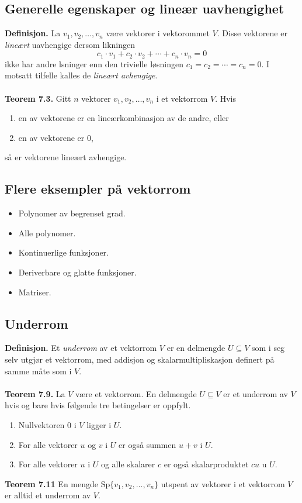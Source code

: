 \documentclass{article}
\begin{document}
\subsection{Generelle egenskaper og lineær uavhengighet}
\textbf{Definisjon.} La $v_1, v_2, \dots, v_n$ være vektorer i vektorommet $V$. Disse vektorene er \textit{lineært} uavhengige dersom likningen
\[c_1 \cdot v_1 + c_2 \cdot v_2 + \cdots + c_n \cdot v_n = 0 \]
ikke har andre lsninger enn den trivielle løsningen $c_1 = c_2 = \cdots = c_n = 0.$ I motsatt tilfelle kalles de \textit{lineært avhengige}.
\\\\
\textbf{Teorem 7.3.} Gitt $n$ vektorer $v_1, v_2, \dots, v_n$ i et vektorrom $V$. Hvis
\begin{enumerate}
    \item en av vektorene er en lineærkombinasjon av de andre, eller
    \item en av vektorene er $0$,
\end{enumerate}
så er vektorene lineært avhengige.


\subsection{Flere eksempler på vektorrom}
\begin{itemize}
    \item Polynomer av begrenset grad.
    \item Alle polynomer.
    \item Kontinuerlige funksjoner.
    \item Deriverbare og glatte funksjoner.
    \item Matriser.
\end{itemize}


\subsection{Underrom}
\textbf{Definisjon.} Et \textit{underrom} av et vektorrom $V$ er en delmengde $U \subseteq V$ som i seg selv utgjør et vektorrom, med addisjon og skalarmultipliskasjon definert på samme måte som i $V$.
\\\\
\textbf{Teorem 7.9.} La $V$ være et vektorrom. En delmengde $U \subseteq V$ er et underrom av $V$ hvis og bare hvis følgende tre betingelser er oppfylt.
\begin{enumerate}
    \item Nullvektoren $0$ i $V$ ligger i $U$.
    \item For alle vektorer $u$ og $v$ i $U$ er også summen $u + v$ i $U$.
    \item For alle vektorer $u$ i $U$ og alle skalarer $c$ er også skalarproduktet $cu$ u $U$.
\end{enumerate}
\textbf{Teorem 7.11} En mengde $\text{Sp}\{v_1, v_2, \dots, v_n\}$ utspent av vektorer i et vektorrom $V$ er alltid et underrom av $V$.
\end{document}
